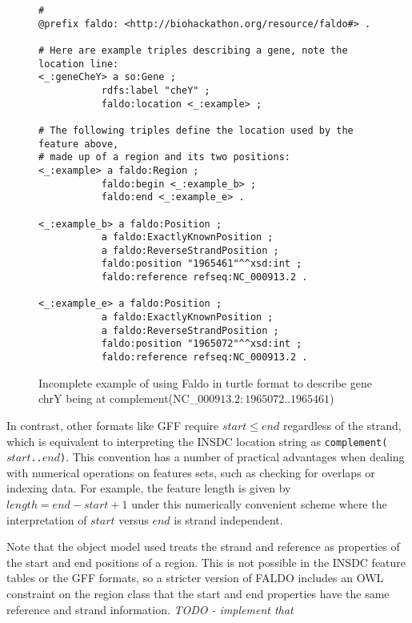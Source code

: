\begin{figure}
\begin{shaded}
\small
\begin{verbatim}
# 
@prefix faldo: <http://biohackathon.org/resource/faldo#> .

# Here are example triples describing a gene, note the location line:
<_:geneCheY> a so:Gene ;
           rdfs:label "cheY" ;
           faldo:location <_:example> ;

# The following triples define the location used by the feature above,
# made up of a region and its two positions:
<_:example> a faldo:Region ;
           faldo:begin <_:example_b> ;
           faldo:end <_:example_e> .

<_:example_b> a faldo:Position ; 
           a faldo:ExactlyKnownPosition ;
           a faldo:ReverseStrandPosition ;
           faldo:position "1965461"^^xsd:int ;
           faldo:reference refseq:NC_000913.2 .

<_:example_e> a faldo:Position ; 
           a faldo:ExactlyKnownPosition ;
           a faldo:ReverseStrandPosition ;
           faldo:position "1965072"^^xsd:int ;
           faldo:reference refseq:NC_000913.2 .
\end{verbatim}
\end{shaded}
\caption{Incomplete example of using Faldo in turtle format to describe
gene chrY being at complement(NC\_$000913.2:1965072..1965461$)}
\label{fig:insdcComplement}
\end{figure}

In contrast, other formats like GFF require $start \leq end$
regardless of the strand, which is equivalent to interpreting
the INSDC location string as \texttt{complement($start$..$end$)}.
This convention has a number of practical advantages when
dealing with numerical operations on features sets, such as
checking for overlaps or indexing data. For example, the
feature length is given by $length = end - start + 1$ under
this numerically convenient scheme where the interpretation
of $start$ versus $end$ is strand independent.

Note that the object model used treats the strand and reference
as properties of the start and end positions of a region. This is
not possible in the INSDC feature tables or the GFF formats,
so a stricter version of FALDO includes an OWL constraint
on the region class that the start and end properties have
the same reference and strand information.
\textit{TODO - implement that}

